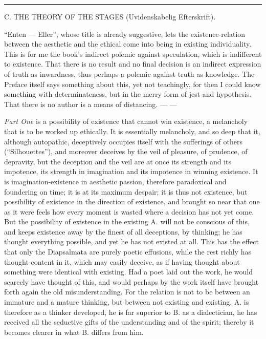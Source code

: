 \documentclass[12pt,a4paper,openany]{book}
\newcommand{\opage}[1]{\marginnote{\footnotesize\textit{[#1]}}}
\newcommand{\excerpthead}[1]{\par\bigskip\begin{center}#1\end{center}\nopagebreak\smallskip}
\newcommand{\sectionrule}{\par\begin{center}\rule{4em}{0.4pt}\end{center}}
\begin{document}
\sectionrule

\excerpthead{C. THE THEORY OF THE STAGES (Uvidenskabelig Efterskrift).}


``Enten --- Eller'', whose title is already suggestive, lets the existence-relation
between the aesthetic and the ethical come into being in existing individuality. This is
for me the book's indirect polemic against speculation, which is indifferent to
existence. That there is no result and no final decision is an indirect expression of
truth as inwardness, thus perhaps a polemic against truth as knowledge. The Preface
itself says something about this, yet not teachingly, for then I could know something
with determinateness, but in the merry form of jest and hypothesis. That there is no
author is a means of distancing. --- ---

\emph{Part One} is a possibility of existence that cannot win existence, a
melancholy that is to be worked up ethically. It is essentially melancholy, and so
deep that it, although autopathic, deceptively occupies itself with the sufferings of
others (``Silhouettes''), and moreover deceives by the veil of pleasure, of prudence,
of depravity, but the deception
\setcounter{footnote}{0}%
\opage{190}and the veil are at once its strength and its impotence, its strength in
imagination and its impotence in winning existence. It is imagination-existence in
aesthetic passion, therefore paradoxical and foundering on time; it is at its maximum
despair; it is thus not existence, but possibility of existence in the direction of
existence, and brought so near that one as it were feels how every moment is wasted
where a decision has not yet come. But the possibility of existence in the existing A.
will not be conscious of this, and keeps existence away by the finest of all
deceptions, by thinking; he has thought everything possible, and yet he has not
existed at all. This has the effect that only the Diapsalmata are purely poetic
effusions, while the rest richly has thought-content in it, which may easily deceive,
as if having thought about something were identical with existing. Had a poet laid out
the work, he would scarcely have thought of this, and would perhaps by the work itself
have brought forth again the old misunderstanding. For the relation is not to be
between an immature and a mature thinking, but between not existing and existing. A.
is therefore as a thinker developed, he is far superior to B. as a dialectician, he
has received all the seductive gifts of the understanding and of the spirit; thereby
it becomes clearer in what B. differs from him.
\end{document}
